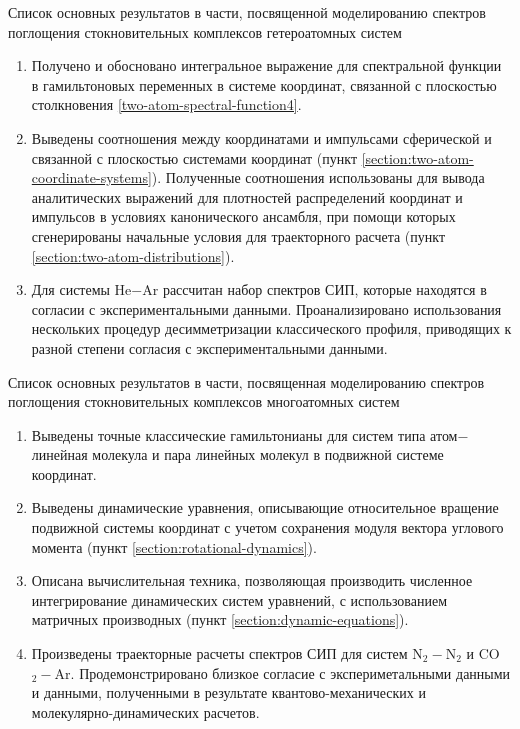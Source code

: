 Список основных результатов в части, посвященной моделированию спектров поглощения стокновительных комплексов гетероатомных систем
\begin{enumerate}
    \item Получено и обосновано интегральное выражение для спектральной функции в гамильтоновых переменных в системе координат, связанной с плоскостью столкновения \eqref{two-atom-spectral-function4}. 
    \item Выведены соотношения между координатами и импульсами сферической и связанной с плоскостью системами координат (пункт \ref{section:two-atom-coordinate-systems}). Полученные соотношения использованы для вывода  аналитических выражений для плотностей распределений координат и импульсов в условиях канонического ансамбля, при помощи которых сгенерированы начальные условия для траекторного расчета (пункт \ref{section:two-atom-distributions}).
    \item Для системы He$-$Ar рассчитан набор спектров СИП, которые находятся в согласии с экспериментальными данными. Проанализировано использования нескольких процедур десимметризации классического профиля, приводящих к разной степени согласия с экспериментальными данными. 
\end{enumerate}

Список основных результатов в части, посвященная моделированию спектров поглощения стокновительных комплексов многоатомных систем
\begin{enumerate}
    \item Выведены точные классические гамильтонианы для систем типа атом$-$линейная молекула и пара линейных молекул в подвижной системе координат.
    \item Выведены динамические уравнения, описывающие относительное вращение подвижной системы координат с учетом сохранения модуля вектора углового момента (пункт \ref{section:rotational-dynamics}).
    \item Описана вычислительная техника, позволяющая производить численное интегрирование динамических систем уравнений, с использованием матричных производных (пункт \ref{section:dynamic-equations}).
    \item Произведены траекторные расчеты спектров СИП для систем N$_2-$N$_2$ и CO$_2-$Ar. Продемонстрировано близкое согласие с экспериметальными данными и данными, полученными в результате квантово-механических и молекулярно-динамических расчетов.
\end{enumerate}

